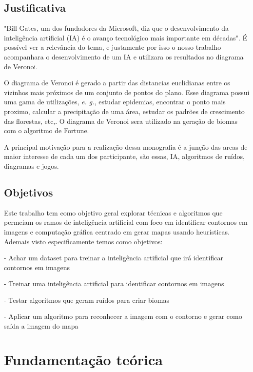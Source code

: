 \documentclass[12pt]{tcc}
\begin{document}
\section{Justificativa}

"Bill Gates, um dos fundadores da Microsoft, diz que o desenvolvimento da inteligência artificial (IA) é o avanço tecnológico mais importante em décadas"\space\citep{inteligencia_artificial_e_avanco_bbc}. É possível ver a relevância do tema, e justamente por isso o nosso trabalho acompanhara o desenvolvimento de um IA e utilizara os resultados no diagrama de Veronoi.

O diagrama de Veronoi é gerado a partir das distancias euclidianas entre os vizinhos mais próximos de um conjunto de pontos do plano\space\citep{diagrama_de_voronoi:_uma_exploracao_nas_distancias_euclidiana_e_do_taxi}. Esse diagrama possui uma gama de utilizações, \emph{e. g.}, estudar epidemias, encontrar o ponto mais proximo, calcular a precipitação de uma área, 
estudar os padrões de crescimento das florestas, etc,\space\citep{poligonos_de_thiessen_ou_voronoi}. O diagrama de Veronoi sera utilizado na geração de biomas com o algoritmo de Fortune.

A principal motivação para a realização dessa monografia é a junção das areas de maior interesse de cada um dos participante, são essas, IA, algoritmos de ruídos, diagramas e jogos.

\section{Objetivos}

Este trabalho tem como objetivo geral explorar técnicas e algoritmos que permeiam os ramos de inteligência artificial com foco em identificar contornos em imagens e computação gráfica centrado em gerar mapas usando heurísticas.
Ademais visto especificamente temos como objetivos:

- Achar um dataset para treinar a inteligência artificial que irá identificar contornos em imagens

- Treinar uma inteligência artificial para identificar contornos em imagens

- Testar algoritmos que geram ruídos para criar biomas 

- Aplicar um algoritmo para reconhecer a imagem com o contorno e gerar como saída a imagem do mapa


\chapter{Fundamentação teórica}
\label{sec:background}
	\label{sec:fund_teorica}
\end{document}
